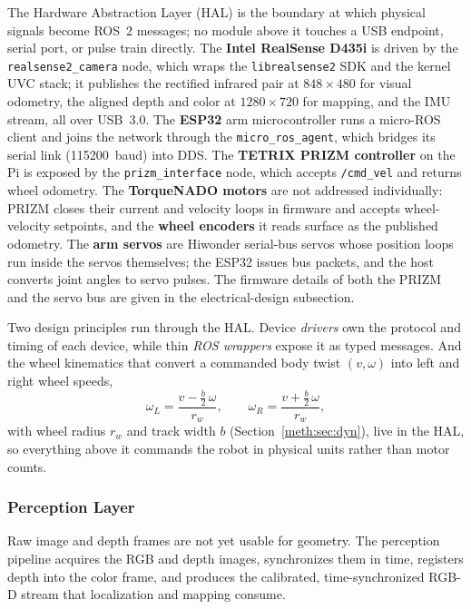 The Hardware Abstraction Layer (HAL) is the boundary at which physical signals become ROS~2 messages; no module above it touches a USB endpoint, serial port, or pulse train directly. The \textbf{Intel RealSense D435i} is driven by the \texttt{realsense2\_camera} node, which wraps the \texttt{librealsense2} SDK and the kernel UVC stack; it publishes the rectified infrared pair at $848\times480$ for visual odometry, the aligned depth and color at $1280\times720$ for mapping, and the IMU stream, all over USB~3.0. The \textbf{ESP32} arm microcontroller runs a micro-ROS client and joins the network through the \texttt{micro\_ros\_agent}, which bridges its serial link (115200~baud) into DDS. The \textbf{TETRIX PRIZM controller} on the Pi is exposed by the \texttt{prizm\_interface} node, which accepts \texttt{/cmd\_vel} and returns wheel odometry. The \textbf{TorqueNADO motors} are not addressed individually: PRIZM closes their current and velocity loops in firmware and accepts wheel-velocity setpoints, and the \textbf{wheel encoders} it reads surface as the published odometry. The \textbf{arm servos} are Hiwonder serial-bus servos whose position loops run inside the servos themselves; the ESP32 issues bus packets, and the host converts joint angles to servo pulses. The firmware details of both the PRIZM and the servo bus are given in the electrical-design subsection.

Two design principles run through the HAL. Device \emph{drivers} own the protocol and timing of each device, while thin \emph{ROS wrappers} expose it as typed messages. And the wheel kinematics that convert a commanded body twist $(v,\omega)$ into left and right wheel speeds,
$$
\omega_L=\frac{v-\tfrac{b}{2}\,\omega}{r_w},\qquad
\omega_R=\frac{v+\tfrac{b}{2}\,\omega}{r_w},
$$
with wheel radius $r_w$ and track width $b$ (Section~\ref{meth:sec:dyn}), live in the HAL, so everything above it commands the robot in physical units rather than motor counts.

\subsubsection{Perception Layer}\label{sec:perception}

Raw image and depth frames are not yet usable for geometry. The perception pipeline acquires the RGB and depth images, synchronizes them in time, registers depth into the color frame, and produces the calibrated, time-synchronized RGB-D stream that localization and mapping consume.

